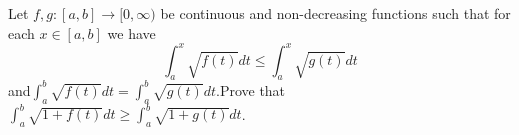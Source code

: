 \documentclass{article}
\begin{document}
\setlength{\parindent}{0pt}
Let $f,g:[a,b]\to[0,\infty)$ be continuous and non-decreasing functions such that for each $x\in[a,b]$ we have$$\int_{a}^{x}\sqrt{f(t)}dt\le\int_{a}^{x}\sqrt{g(t)}dt$$and$\int_{a}^{b}\sqrt{f(t)}dt=\int_{a}^{b}\sqrt{g(t)}dt$.\newline Prove that $\int_{a}^{b}\sqrt{1+f(t)}dt\ge\int_{a}^{b}\sqrt{1+g(t)}dt$.
\end{document}
